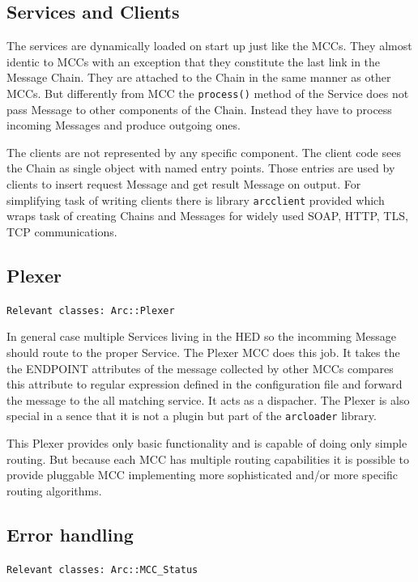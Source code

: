 \documentclass{book}
\begin{document}
\subsection{Services and Clients}

The services are dynamically loaded on start up just like the MCCs. They almost identic to MCCs with an exception that they constitute the last link in the Message Chain. They are attached to the Chain in the same manner as other MCCs. But differently from MCC the \texttt{process()} method of the Service does not pass Message to other components of the Chain. Instead they have to process incoming Messages and produce outgoing ones.

The clients are not represented by any specific component. The client code sees the Chain as single object with named entry points. Those entries are used by clients to insert request Message and get result Message on output. For simplifying task of writing clients there is library \texttt{arcclient} provided which wraps task of creating Chains and Messages for widely used SOAP, HTTP, TLS, TCP communications.


\subsection{Plexer}

\texttt{Relevant classes: Arc::Plexer }

In general case multiple Services living in the HED so the incomming Message should route to the proper Service. The Plexer MCC does this job. It takes the the ENDPOINT attributes of the message collected by other MCCs compares this attribute to regular expression defined in the configuration file and forward the message to the all matching service. It acts as a dispacher. The Plexer is also special in a sence that it is not a plugin but part of the \texttt{arcloader} library. 

This Plexer provides only basic functionality and is capable of doing only simple routing. But because each MCC has multiple routing capabilities it is possible to provide pluggable MCC implementing more sophisticated and/or more specific routing algorithms.


\subsection{Error handling}

\texttt{Relevant classes: Arc::MCC\_Status}
\end{document}
